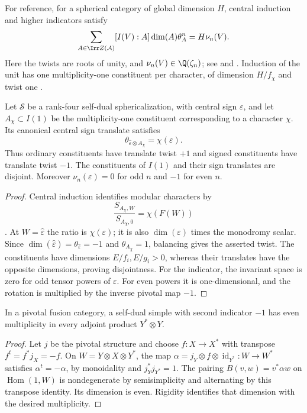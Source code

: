 For reference, for a spherical category of global dimension $H$,
central induction and higher indicators satisfy
\begin{equation}\label{core:central-indicator}
\sum_{A\in\Irr Z(\mathcal A)}[I(V):A]\dim(A)\theta_A^n=H\nu_n(V).
\end{equation}
Here the twists are roots of unity, and
$\nu_n(V)\in\Q(\zeta_n)$; see \cite[Theorem~4.1]{NS} and
\cite[Theorem~5.1]{NSHigher}. Induction of the unit has one
multiplicity-one constituent per character, of dimension $H/f_\chi$
and twist one \cite[Theorems~2.5 and~2.13]{Ostrik3}.
\begin{lemma}
\label{core:lem:translate-twists}
Let $\mathcal S$ be a rank-four self-dual sphericalization, with
central sign $\varepsilon$, and let $A_\chi\subset I(1)$ be the
multiplicity-one constituent corresponding to a character $\chi$.
Its canonical central sign translate satisfies
\[
 \theta_{\widehat\varepsilon\otimes A_\chi}=\chi(\varepsilon).
\]
Thus ordinary constituents have translate twist $+1$ and signed
constituents have translate twist $-1$. The constituents of $I(1)$
and their sign translates are disjoint. Moreover
$\nu_n(\varepsilon)=0$ for odd $n$ and $-1$ for even $n$.
\end{lemma}
\begin{proof}
Central induction identifies modular characters by
\[
 \frac{S_{A_\chi,W}}{S_{A_\chi,0}}=\chi(F(W))
\]
\cite[Example~2.9 and the paragraph preceding Theorem~2.13]{Ostrik3}.
At $W=\widehat\varepsilon$ the ratio is $\chi(\varepsilon)$;
it is also $\dim(\varepsilon)$ times the monodromy scalar.
Since $\dim(\widehat\varepsilon)=\theta_{\widehat\varepsilon}=-1$
and $\theta_{A_\chi}=1$, balancing gives the asserted twist.
The constituents have dimensions $E/f_i,E/g_i>0$, whereas their
translates have the opposite dimensions, proving disjointness.
For the indicator, the invariant space is zero for odd tensor powers
of $\varepsilon$. For even powers it is one-dimensional, and the
rotation is multiplied by the inverse pivotal map $-1$.
\end{proof}

\begin{lemma}\label{core:lem:adjoint-parity}
In a pivotal fusion category, a self-dual simple with second indicator $-1$ has even multiplicity in every adjoint product $Y^*\otimes Y$.
\end{lemma}
\begin{proof}
Let $j$ be the pivotal structure and choose $f:X\to X^*$ with transpose $f^t=f^*j_X=-f$. On $W=Y\otimes X\otimes Y^*$, the map
$\alpha=j_Y\otimes f\otimes\operatorname{id}_{Y^*}:W\to W^*$ satisfies $\alpha^t=-\alpha$, by monoidality and $j_Y^*j_{Y^*}=1$. The pairing
$B(v,w)=v^*\alpha w$ on $\operatorname{Hom}(1,W)$ is nondegenerate by semisimplicity and alternating by this transpose identity. Its dimension is even. Rigidity identifies that dimension with the desired multiplicity.
\end{proof}

